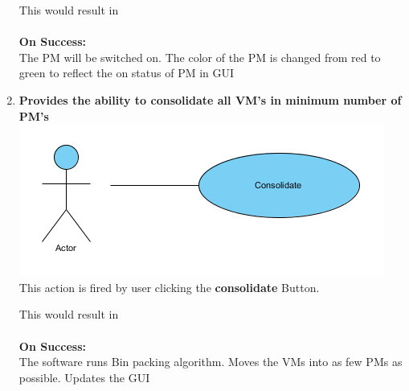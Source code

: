 \documentclass[a4paper,11pt]{article}
\begin{document}
\begin{enumerate}
				This would result in \\\\
				{\bf On Success: }\\
				The PM will be switched on. The color of the PM is changed from red to green to reflect the on 
				status of PM in GUI 
				
				
				
				\item {\bf Provides the ability to consolidate all VM's in minimum number of PM's}\\
				\includegraphics{images/consolidate}
 				\\This action is fired by user clicking the {\bf consolidate} Button. 
								
				This would result in \\\\
				{\bf On Success: }\\
				The software runs Bin packing algorithm. Moves the VMs into as few PMs as possible. Updates the GUI
				\\
				

			\end{enumerate}
			
			
			
			
			
\end{document}
